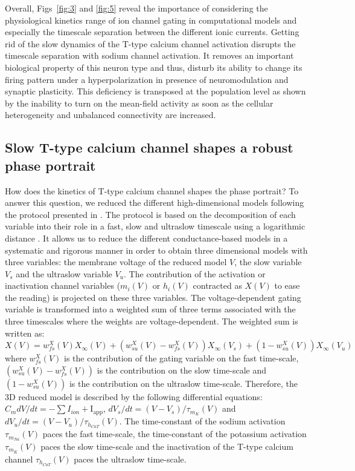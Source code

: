 Overall, Figs~\ref{fig:3} and \ref{fig:5} reveal the importance of considering the physiological kinetics range of ion channel gating in computational models and especially the timescale separation between the different ionic currents. Getting rid of the slow dynamics of the T-type calcium channel activation disrupts the timescale separation with sodium channel activation. It removes an important biological property of this neuron type and thus, disturb its ability to change its firing pattern under a hyperpolarization in presence of neuromodulation and synaptic plasticity. This deficiency is transposed at the population level as shown by the inability to turn on the mean-field activity as soon as the cellular heterogeneity and unbalanced connectivity are increased.

\subsection{Slow T-type calcium channel shapes a robust phase portrait}
How does the kinetics of T-type calcium channel shapes the phase portrait? To answer this question, we reduced the different high-dimensional models following the protocol presented in \citep{drion_dynamic_2015}. The protocol is based on the decomposition of each variable into their role in a fast, slow and ultraslow timescale using a logarithmic distance \citep{drion_dynamic_2015}.  It allows us to reduce the different conductance-based models in a systematic and rigorous manner in order to obtain three dimensional models with three variables: the membrane voltage of the reduced model $V$,  the slow variable $V_s$ and the ultraslow variable $V_u$.  The contribution of the activation or inactivation channel variables ($m_i(V)$ or $h_i(V)$ contracted as $X(V)$ to ease the reading) is projected on these three variables. The voltage-dependent gating variable is transformed into a weighted sum of three terms associated with the three timescales where the weights are voltage-dependent.  The weighted sum is written as: $X(V) = w_{fs}^{X}(V) X_{\infty}(V) + (w_{su}^{X}(V) - w_{fs}^{X}(V))X_{\infty}(V_s) + (1-w_{su}^{X}(V)) X_{\infty}(V_{u}) $ where $w_{fs}^{X}(V)$ is the contribution of the gating variable on the fast time-scale,  $(w_{su}^{X}(V)- w_{fs}^{X}(V))$ is the contribution on the slow time-scale and $(1-w_{su}^{X}(V))$ is the contribution on the ultraslow time-scale.  Therefore, the 3D reduced model is described by the following differential equations: $ C_m dV/dt = - \sum I_{ion} + \text{I}_\text{{app}}$, $dV_s/dt = (V - V_s)/ \tau_{m_K}(V)$ and $dV_{u}/dt = (V - V_{u})/\tau_{h_{CaT}}(V)$. The time-constant of the sodium activation $\tau_{m_{Na}}(V)$ paces the fast time-scale,  the time-constant of the potassium activation $\tau_{m_K}(V)$  paces the slow time-scale and the inactivation of the T-type calcium channel $\tau_{h_{CaT}}(V)$ paces the ultraslow time-scale.


